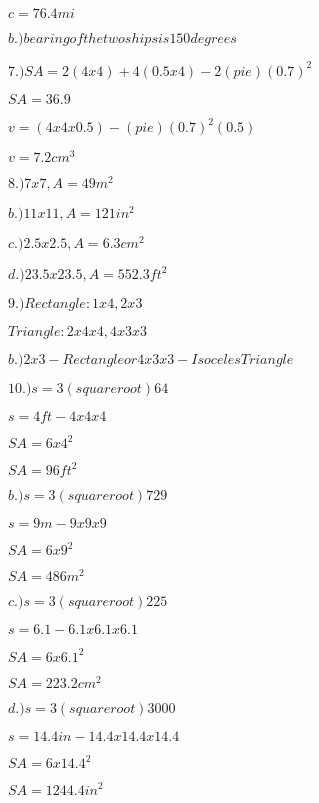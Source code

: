 \documentclass{article}
\begin{document}
\vspace
$c=76.4 mi$

\vspace
$b.)bearing of the two ships is 150 degrees$

\vspace
$7.)SA=2(4x4)+4(0.5x4)-2(pie)(0.7)^2$

\vspace
$SA=36.9$

\vspace
$v=(4x4x0.5)-(pie)(0.7)^2(0.5)$

\vspace
$v=7.2cm^3$

\vspace
$8.)7x7, A=49m^2$

\vspace
$b.)11x11, A=121in^2$

\vspace
$c.)2.5x2.5, A=6.3cm^2$

\vspace
$d.)23.5x23.5, A=552.3ft^2$

\vspace
$9.)Rectangle: 1x4,2x3$

\vspace 
$Triangle: 2x4x4, 4x3x3$

\vspace
$b.)2x3- Rectangle or 4x3x3- Isoceles Triangle$

\vspace
$10.)s= 3(square root)64$

\vspace
$s=4ft- 4x4x4$

\vspace
$SA=6x4^2$

\vspace
$SA=96ft^2$

\vspace
$b.)s=3(square root)729$

\vspace
$s=9m- 9x9x9$

\vspace
$SA=6x9^2$

\vspace
$SA=486m^2$

\vspace
$c.)s=3(square root)225$

\vspace
$s=6.1- 6.1x6.1x6.1$

\vspace
$SA=6x6.1^2$

\vspace
$SA=223.2cm^2$

\vspace
$d.)s=3(square root)3000$

\vspace
$s=14.4in- 14.4x14.4x14.4$

\vspace
$SA=6x14.4^2$

\vspace
$SA=1244.4in^2$













    























  


  
  
  
  






  
\end{document}
